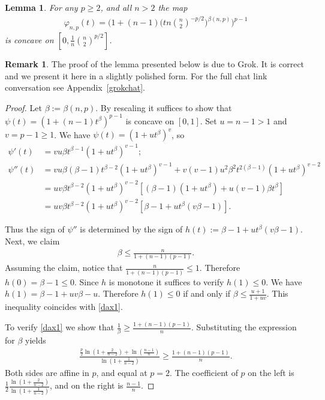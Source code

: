 \documentclass[11pt]{article}
\newtheorem{lemma}[theorem]{Lemma}
\theoremstyle{definition}
\newtheorem{remark}[theorem]{Remark}
\newcommand{\1}{\mathbf{1}}
\begin{document}
\begin{lemma}\label{conc1}
For any $p\geq 2$, and all $n>2$ the map 
\begin{align*}
    \varphi_{n,p}(t) = \Big(1+(n-1) \Big( t n \binom{n}{2}^{-p/2} \Big)^{\beta(n,p)}\Big)^{p-1}
\end{align*}
is concave on $\left[0,\frac{1}{n} \binom{n}{2}^{p/2}\right]$. 
\end{lemma}
\begin{remark}
The proof of the lemma presented below is due to Grok. It is correct and we present it here in a slightly polished form. For the full chat link conversation see Appendix~\ref{grokchat}. 
\end{remark}
\begin{proof}
Let $\beta:=\beta(n,p)$. By rescaling it suffices to show that $\psi(t) = (1+(n-1)t^{\beta})^{p-1}$ is concave on $[0,1]$. Set $u=n-1>1$ and $v=p-1\geq 1$. We have $\psi(t) = (1+ut^{\beta})^{v}$, so 
\begin{align*}
    \psi'(t) &= vu\beta t^{\beta-1}(1+ut^{\beta})^{v-1};\\
    \psi''(t) &= vu\beta (\beta-1) t^{\beta-2}(1+ut^{\beta})^{v-1}+v(v-1)u^{2}\beta^{2} t^{2(\beta-1)}(1+ut^{\beta})^{v-2}\\
    &=uv\beta t^{\beta-2}(1+ut^{\beta})^{v-2}[(\beta-1)(1+ut^{\beta})+u(v-1)\beta t^{\beta}]\\
    &=uv\beta t^{\beta-2}(1+ut^{\beta})^{v-2} [\beta -1 +ut^{\beta}(v\beta-1)].
\end{align*}

Thus the sign of $\psi''$ is determined by the sign of $h(t) := \beta -1 +ut^{\beta}(v\beta-1)$. Next, we claim 
\begin{align}\label{dax1}
    \beta \leq \frac{n}{1+(n-1)(p-1)}. 
\end{align}
Assuming the claim, notice that $\frac{n}{1+(n-1)(p-1)}\leq 1$. Therefore $h(0) = \beta-1\leq 0$. Since $h$ is monotone it suffices to verify $h(1)\leq 0$. We have $h(1) = \beta-1 + uv\beta-u$. Therefore $h(1)\leq 0$ if and only if $\beta \leq \frac{u+1}{1+uv}$. This inequality coincides with \eqref{dax1}. 

To verify \eqref{dax1} we show that $\frac{1}{\beta} \geq \frac{1+(n-1)(p-1)}{n}$. Substituting the expression for $\beta$ yields 
\begin{align*}
    \frac{\frac{p}{2}\ln\left(1+\frac{2}{n-2} \right) + \ln\left(\frac{n-1}{n}\right)}{\ln\left(1+ \frac{1}{n-2}\right)} \geq \frac{1+(n-1)(p-1)}{n}.
\end{align*}
Both sides are affine in $p$, and equal at $p=2$.  The coefficient of $p$ on the left is $\frac{1}{2} \frac{ \ln\left(1 + \frac{2}{n-2}\right) }{ \ln\left(1 + \frac{1}{n-2}\right) }$, and on the right is $\frac{n-1}{n}$.


\end{proof}
\end{document}
